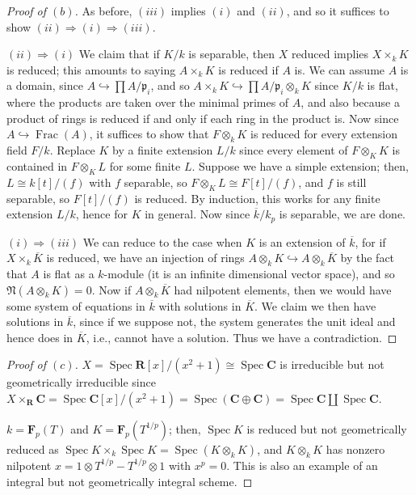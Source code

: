 \documentclass[10pt]{article}
\theoremstyle{definition}
\theoremstyle{remark}
\numberwithin{equation}{section}
\numberwithin{figure}{subsubsection}
\DeclareMathOperator{\Spec}{Spec}
\DeclareMathOperator{\Frac}{Frac}
\begin{document}
\begin{proof}[Proof of $(b)$]
  As before, $(iii)$ implies $(i)$ and $(ii)$, and so it suffices to show $(ii) \Rightarrow (i) \Rightarrow (iii)$.
  \par $(ii) \Rightarrow (i)$ We claim that if $K/k$ is separable, then $X$ reduced implies $X \times_k K$ is reduced; this amounts to saying $A \times_k K$ is reduced if $A$ is. We can assume $A$ is a domain, since $A \hookrightarrow \prod A/\mathfrak{p}_i$, and so $A \times_k K \hookrightarrow \prod A/\mathfrak{p}_i \otimes_k K$ since $K/k$ is flat, where the products are taken over the minimal primes of $A$, and also because a product of rings is reduced if and only if each ring in the product is. Now since $A \hookrightarrow \Frac(A)$, it suffices to show that $F \otimes_k K$ is reduced for every extension field $F/k$. Replace $K$ by a finite extension $L/k$ since every element of $F \otimes_K K$ is contained in $F \otimes_K L$ for some finite $L$. Suppose we have a simple extension; then, $L \cong k[t]/(f)$ with $f$ separable, so $F \otimes_K L \cong F[t]/(f)$, and $f$ is still separable, so $F[t]/(f)$ is reduced. By induction, this works for any finite extension $L/k$, hence for $K$ in general. Now since $\overline{k}/k_p$ is separable, we are done.
  \par $(i) \Rightarrow (iii)$ We can reduce to the case when $K$ is an extension of $\overline{k}$, for if $X \times_k \overline{K}$ is reduced, we have an injection of rings $A \otimes_k K \hookrightarrow A \otimes_k \overline{K}$ by the fact that $A$ is flat as a $k$-module (it is an infinite dimensional vector space), and so $\mathfrak{N}(A \otimes_k K) = 0$. Now if $A \otimes_k \overline{K}$ had nilpotent elements, then we would have some system of equations in $\overline{k}$ with solutions in $\overline{K}$. We claim we then have solutions in $\overline{k}$, since if we suppose not, the system generates the unit ideal and hence does in $\overline{K}$, i.e., cannot have a solution. Thus we have a contradiction.
\end{proof}
\begin{proof}[Proof of $(c)$]
  $X = \Spec \mathbf{R}[x]/(x^2+1) \cong \Spec \mathbf{C}$ is irreducible but not geometrically irreducible since $X \times_\mathbf{R} \mathbf{C} = \Spec \mathbf{C}[x]/(x^2+1) = \Spec(\mathbf{C}\oplus\mathbf{C}) = \Spec\mathbf{C}\amalg\Spec\mathbf{C}$.
    \par $k = \mathbf{F}_p(T)$ and $K = \mathbf{F}_p(T^{1/p})$; then, $\Spec K$ is reduced but not geometrically reduced as $\Spec K \times_k \Spec K = \Spec (K \otimes_k K)$, and $K\otimes_k K$ has nonzero nilpotent $x = 1 \otimes T^{1/p} - T^{1/p} \otimes 1$ with $x^p = 0$. This is also an example of an integral but not geometrically integral scheme.
\end{proof}
\end{document}
